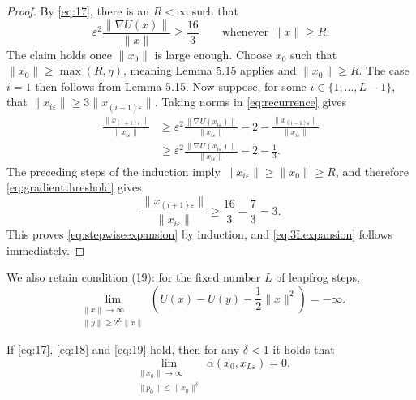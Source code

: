 \begin{proof}
By \eqref{eq:17}, there is an $R<\infty$ such that
\begin{equation}
 \varepsilon^2\frac{\|\nabla U(x)\|}{\|x\|}
 \geq\frac{16}{3}
 \qquad\text{whenever }\|x\|\geq R.
 \label{eq:gradientthreshold}
\end{equation}
The claim holds once $\|x_0\|$ is large enough. Choose $x_0$ such that $\|x_0\| \geq \max(R,\eta)$, meaning Lemma 5.15 applies and $\|x_0\|\geq R$.
The case $i=1$ then follows from Lemma 5.15.  Now suppose, for some $i\in\{1,\ldots,L-1\}$, that
$\|x_{i\varepsilon}\|\geq3\|x_{(i-1)\varepsilon}\|$. Taking norms in
\eqref{eq:recurrence} gives
\begin{align*}
 \frac{\|x_{(i+1)\varepsilon}\|}{\|x_{i\varepsilon}\|}
 &\geq
 \varepsilon^2
 \frac{\|\nabla U(x_{i\varepsilon})\|}{\|x_{i\varepsilon}\|}
 -2-
 \frac{\|x_{(i-1)\varepsilon}\|}{\|x_{i\varepsilon}\|}\\
 &\geq
 \varepsilon^2
 \frac{\|\nabla U(x_{i\varepsilon})\|}{\|x_{i\varepsilon}\|}
 -2-\frac13.
\end{align*}
The preceding steps of the induction imply
$\|x_{i\varepsilon}\|\geq\|x_0\|\geq R$, and therefore
\eqref{eq:gradientthreshold} gives
\[
 \frac{\|x_{(i+1)\varepsilon}\|}{\|x_{i\varepsilon}\|}
 \geq\frac{16}{3}-\frac{7}{3}=3.
\]
This proves \eqref{eq:stepwiseexpansion} by induction, and
\eqref{eq:3Lexpansion} follows immediately.
\end{proof}

We also retain condition (19): for the fixed number $L$ of leapfrog steps,
\begin{equation}
 \lim_{\substack{\|x\|\to\infty\\
                  \|y\|\geq2^L\|x\|}}
 \left(U(x)-U(y)-\frac12\|x\|^2\right)=-\infty.
 \tag{19}
 \label{eq:19}
\end{equation}

\begin{lemma517}
If \eqref{eq:17}, \eqref{eq:18} and \eqref{eq:19} hold, then for any
$\delta<1$ it holds that
\[
 \lim_{\substack{\|x_0\|\to\infty\\
                  \|p_0\|\leq\|x_0\|^\delta}}
 \alpha(x_0,x_{L\varepsilon})=0.
\]
\end{lemma517}

